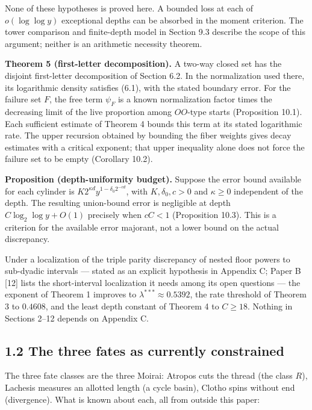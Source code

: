 \documentclass[11pt,a4paper]{article}
\begin{document}
None of these hypotheses is proved here. A bounded loss at each of
\(o(\log\log y)\) exceptional depths can be absorbed in the moment
criterion. The tower comparison and finite-depth model in Section 9.3
describe the scope of this argument; neither is an arithmetic necessity
theorem.

\textbf{Theorem 5 (first-letter decomposition).} A two-way closed set
has the disjoint first-letter decomposition of Section 6.2. In the
normalization used there, its logarithmic density satisfies (6.1), with
the stated boundary error. For the failure set \(F\), the free term
\(\psi_F\) is a known normalization factor times the decreasing limit of
the live proportion among \(OO\)-type starts (Proposition 10.1). Each
sufficient estimate of Theorem 4 bounds this term at its stated
logarithmic rate. The upper recursion obtained by bounding the fiber
weights gives decay estimates with a critical exponent; that upper
inequality alone does not force the failure set to be empty (Corollary
10.2).

\textbf{Proposition (depth-uniformity budget).} Suppose the error bound
available for each cylinder is \(K2^{\kappa d}y^{1-\delta_0 2^{-cd}}\),
with \(K,\delta_0,c>0\) and \(\kappa\ge0\) independent of the depth. The
resulting union-bound error is negligible at depth
\(C\log_2\log y+O(1)\) precisely when \(cC<1\) (Proposition 10.3). This
is a criterion for the available error majorant, not a lower bound on
the actual discrepancy.

Under a localization of the triple parity discrepancy of nested floor
powers to sub-dyadic intervals --- stated as an explicit hypothesis in
Appendix C; Paper B {[}12{]} lists the short-interval localization it
needs among its open questions --- the exponent of Theorem 1 improves to
\(\lambda^{***}\approx0.5392\), the rate threshold of Theorem 3 to
\(0.4608\), and the least depth constant of Theorem 4 to \(C\ge 18\).
Nothing in Sections 2--12 depends on Appendix C.

\subsection{1.2 The three fates as currently
constrained}\label{the-three-fates-as-currently-constrained}

The three fate classes are the three Moirai: Atropos cuts the thread
(the class \(R\)), Lachesis measures an allotted length (a cycle basin),
Clotho spins without end (divergence). What is known about each, all
from outside this paper:
\end{document}
